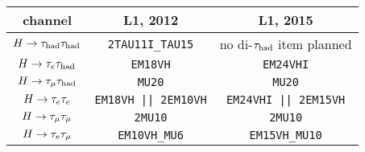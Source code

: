 \begin{tabular}{c|c|c}
  channel      & L1, 2012                    & L1, 2015 \\
  \hline\hline
  $H\rightarrow\tau_\text{had}\tau_\text{had}$ & \texttt{2TAU11I\_TAU15}     & no di-$\tau_\text{had}$ item planned  \\
  \hline
  $H\rightarrow\tau_e \tau_\text{had}$ & \texttt{EM18VH}             & \texttt{EM24VHI}            \\
  $H\rightarrow\tau_\mu \tau_\text{had}$ & \texttt{MU20}               & \texttt{MU20}               \\
  \hline
  $H\rightarrow\tau_e \tau_e$ & \texttt{EM18VH || 2EM10VH}  & \texttt{EM24VHI || 2EM15VH} \\
  $H\rightarrow\tau_\mu \tau_\mu$ & \texttt{2MU10}              & \texttt{2MU10}              \\
  $H\rightarrow\tau_e \tau_\mu$ & \texttt{EM10VH\_MU6}        & \texttt{EM15VH\_MU10}       \\
\end{tabular}

